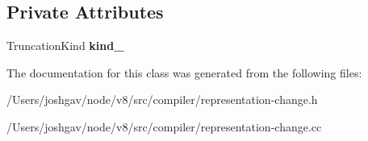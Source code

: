 \subsection*{Private Attributes}
\begin{DoxyCompactItemize}
\item 
Truncation\+Kind {\bfseries kind\+\_\+}\hypertarget{classv8_1_1internal_1_1compiler_1_1_truncation_aa4dd6915a8a7f7356f2eb96a68eb854a}{}\label{classv8_1_1internal_1_1compiler_1_1_truncation_aa4dd6915a8a7f7356f2eb96a68eb854a}

\end{DoxyCompactItemize}


The documentation for this class was generated from the following files\+:\begin{DoxyCompactItemize}
\item 
/\+Users/joshgav/node/v8/src/compiler/representation-\/change.\+h\item 
/\+Users/joshgav/node/v8/src/compiler/representation-\/change.\+cc\end{DoxyCompactItemize}
